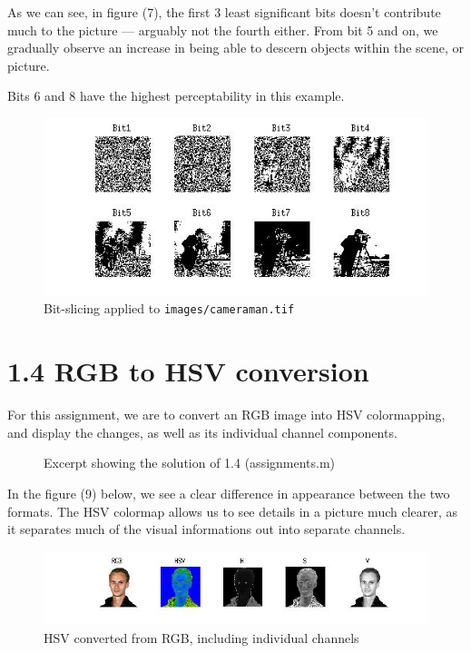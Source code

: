 \documentclass[11pt]{article}
\newcommand{\file}[1]{{\tt #1}}
\newcommand{\codefig}[5]
{
\begin{figure}[H]
    
    \caption{#5 (#2)}
    \label{code:#1}
\end{figure}
}
\begin{document}
\begin{multicols}{2}

    As we can see, in figure (7), the first 3 least significant bits doesn't
    contribute much to the picture --- arguably not the fourth either. From
    bit 5 and on, we gradually observe an increase in being able to descern
    objects within the scene, or picture.
    
    Bits 6 and 8 have the highest perceptability in this example.
    
    \vfill\columnbreak

    \begin{figure}[H]
        \center
        \includegraphics[scale=0.5]{figures/1-3.jpg}
        \caption{Bit-slicing applied to \file{images/cameraman.tif}}
    \end{figure}

\end{multicols}


\section{1.4 \mdseries RGB to HSV conversion}
\label{sec:1-4}
For this assignment, we are to convert an RGB image into HSV colormapping, and
display the changes, as well as its individual channel components.

\codefig{1-4}{assignments.m}{40}{51}{Excerpt showing the solution of 1.4}

In the figure (9) below, we see a clear difference in appearance between the
two formats. The HSV colormap allows us to see details in a picture much
clearer, as it separates much of the visual informations out into separate
channels.

\begin{figure}[H]
    \hspace{-3.5cm}\includegraphics[scale=0.9]{figures/1-4.jpg}
    \caption{HSV converted from RGB, including individual channels}
\end{figure}
\end{document}

